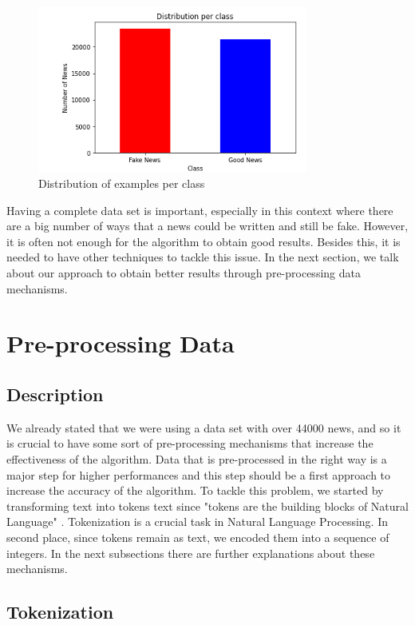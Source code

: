 \documentclass[conference]{IEEEtran}
\begin{document}
\begin{figure}[H]
    \centering
    \includegraphics[width=3.5in]{pictures/DistributionClasses.PNG}
    \caption{Distribution of examples per class}\label{fig:distributionClasses}
\end{figure}

Having a complete data set is important, especially in this context where there are a big number of ways that a news could be written and still be fake. However, it is often not enough for the algorithm to obtain good results. Besides this, it is needed to have other techniques to tackle this issue. In the next section, we talk about our approach to obtain better results through pre-processing data mechanisms.

\section{Pre-processing Data}
\subsection{Description}

We already stated that we were using a data set with over 44000 news, and so it is crucial to have some sort of pre-processing mechanisms that increase the effectiveness of the algorithm. Data that is pre-processed in the right way is a major step for higher performances and this step should be a first approach to increase the accuracy of the algorithm. To tackle this problem, we started by transforming text into tokens text since "tokens are the building blocks of Natural Language" \cite{W}. Tokenization is a crucial task in Natural Language Processing. In second place, since tokens remain as text, we encoded them into a sequence of integers. In the next subsections there are further explanations about these mechanisms.

\subsection{Tokenization}
\end{document}
